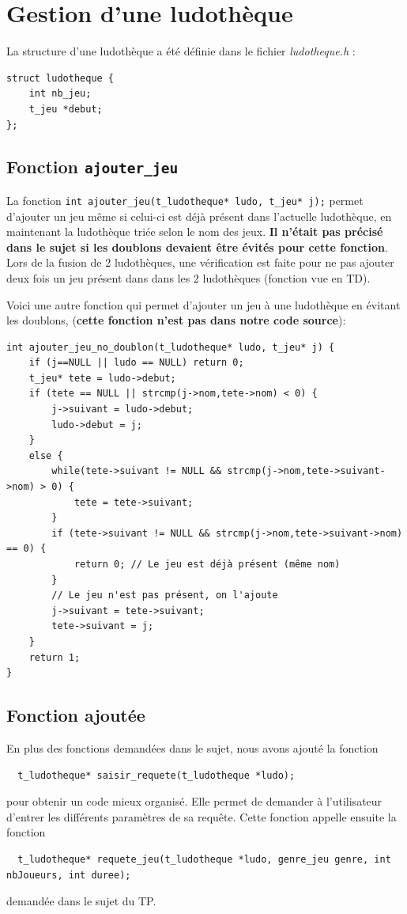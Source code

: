 \section{Gestion d'une ludothèque}
La structure d'une ludothèque a été définie dans le fichier \textit{ludotheque.h} :
\begin{lstlisting}
struct ludotheque {
    int nb_jeu;
    t_jeu *debut;
};
\end{lstlisting}

\subsection{Fonction \lstinline{ajouter_jeu}}
La fonction \lstinline{int ajouter_jeu(t_ludotheque* ludo, t_jeu* j);} permet d'ajouter un jeu même si celui-ci est déjà présent dans l'actuelle ludothèque, en maintenant la ludothèque triée selon le nom des jeux. \textbf{Il n'était pas précisé dans le sujet si les doublons devaient être évités pour cette fonction}. Lors de la fusion de 2 ludothèques, une vérification est faite pour ne pas ajouter deux fois un jeu présent dans dans les 2 ludothèques (fonction vue en TD).

\medskip

Voici une autre fonction qui permet d'ajouter un jeu à une ludothèque en évitant les doublons, (\textbf{cette fonction n'est pas dans notre code source}):
\begin{lstlisting}
int ajouter_jeu_no_doublon(t_ludotheque* ludo, t_jeu* j) {
    if (j==NULL || ludo == NULL) return 0;
    t_jeu* tete = ludo->debut;
    if (tete == NULL || strcmp(j->nom,tete->nom) < 0) {
        j->suivant = ludo->debut;
        ludo->debut = j;
    }
    else {
        while(tete->suivant != NULL && strcmp(j->nom,tete->suivant->nom) > 0) {
            tete = tete->suivant;
        }
        if (tete->suivant != NULL && strcmp(j->nom,tete->suivant->nom) == 0) {
            return 0; // Le jeu est déjà présent (même nom)
        }
        // Le jeu n'est pas présent, on l'ajoute
        j->suivant = tete->suivant;
        tete->suivant = j;
    }
    return 1;
}
\end{lstlisting}

\subsection{Fonction ajoutée}
En plus des fonctions demandées dans le sujet, nous avons ajouté la fonction
\begin{lstlisting}
  t_ludotheque* saisir_requete(t_ludotheque *ludo);
\end{lstlisting}
pour obtenir un code mieux organisé. Elle permet de demander à l'utilisateur d'entrer les différents paramètres de sa requête. Cette fonction appelle ensuite la fonction
\begin{lstlisting}
  t_ludotheque* requete_jeu(t_ludotheque *ludo, genre_jeu genre, int nbJoueurs, int duree);
\end{lstlisting}
demandée dans le sujet du TP.

